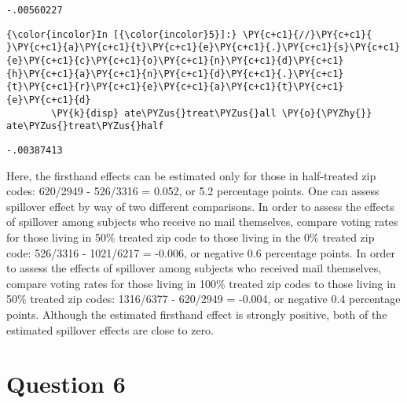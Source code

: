 \documentclass[11pt,notitlepage]{article}\usepackage[]{graphicx}\usepackage[]{color}
\makeatletter
\newenvironment{kframe}{%
 \def\at@end@of@kframe{}%
 \ifinner\ifhmode%
  \def\at@end@of@kframe{\end{minipage}}%
  \begin{minipage}{\columnwidth}%
 \fi\fi%
 \def\FrameCommand##1{\hskip\@totalleftmargin \hskip-\fboxsep
 \colorbox{shadecolor}{##1}\hskip-\fboxsep
     \hskip-\linewidth \hskip-\@totalleftmargin \hskip\columnwidth}%
 \MakeFramed {\advance\hsize-\width
   \@totalleftmargin\z@ \linewidth\hsize
   \@setminipage}}%
 {\par\unskip\endMakeFramed%
 \at@end@of@kframe}
\newenvironment{knitrout}{}{} %
\makeatother
\begin{document}
\begin{enumerate}[a)]
\begin{knitrout}
\begin{kframe}
    \begin{Verbatim}[commandchars=\\\{\}]
-.00560227

    \end{Verbatim}

    \begin{Verbatim}[commandchars=\\\{\}]
{\color{incolor}In [{\color{incolor}5}]:} \PY{c+c1}{//}\PY{c+c1}{ }\PY{c+c1}{a}\PY{c+c1}{t}\PY{c+c1}{e}\PY{c+c1}{.}\PY{c+c1}{s}\PY{c+c1}{e}\PY{c+c1}{c}\PY{c+c1}{o}\PY{c+c1}{n}\PY{c+c1}{d}\PY{c+c1}{h}\PY{c+c1}{a}\PY{c+c1}{n}\PY{c+c1}{d}\PY{c+c1}{.}\PY{c+c1}{t}\PY{c+c1}{r}\PY{c+c1}{e}\PY{c+c1}{a}\PY{c+c1}{t}\PY{c+c1}{e}\PY{c+c1}{d}
        \PY{k}{disp} ate\PYZus{}treat\PYZus{}all \PY{o}{\PYZhy{}} ate\PYZus{}treat\PYZus{}half
\end{Verbatim}

    \begin{Verbatim}[commandchars=\\\{\}]
-.00387413
    \end{Verbatim}
\end{kframe}
\end{knitrout}

Here, the firsthand effects can be estimated only for those in half-treated zip codes: 620/2949 - 526/3316 = 0.052, or 5.2 percentage points. One can assess spillover effect by way of two different comparisons. In order to assess the effects of spillover among subjects who receive no mail themselves, compare voting rates for those living in 50\% treated zip code to those living in the 0\% treated zip code: 526/3316 - 1021/6217 = -0.006, or negative 0.6 percentage points. In order to assess the effects of spillover among subjects who received mail themselves, compare voting rates for those living in 100\% treated zip codes to those living in 50\% treated zip codes:  1316/6377 - 620/2949 = -0.004, or negative 0.4 percentage points.  Although the estimated firsthand effect is strongly positive, both of the estimated spillover effects are close to zero.
\end{enumerate}

\section*{Question 6}
\begin{knitrout}
\color{fgcolor}\begin{kframe}
\begin{verbatim}






\end{verbatim}
\end{kframe}
\end{knitrout}
\end{document}
